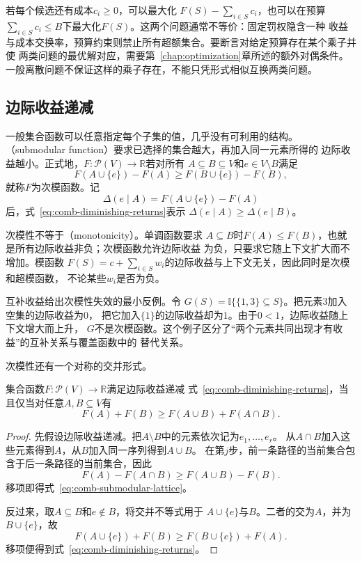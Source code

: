 若每个候选还有成本$c_i\geq0$，可以最大化
$F(S)-\sum_{i\in S}c_i$，也可以在预算
$\sum_{i\in S}c_i\leq B$下最大化$F(S)$。这两个问题通常不等价：固定罚权隐含一种
收益与成本交换率，预算约束则禁止所有超额集合。要断言对给定预算存在某个乘子并使
两类问题的最优解对应，需要第~\ref{chap:optimization}章所述的额外对偶条件。
一般离散问题不保证这样的乘子存在，不能只凭形式相似互换两类问题。

\subsection{边际收益递减}

一般集合函数可以任意指定每个子集的值，几乎没有可利用的结构。
（submodular function）要求已选择的集合越大，再加入同一元素所得的
边际收益越小。正式地，$F:\mathcal{P}(V)\to\mathbb{R}$若对所有
$A\subseteq B\subseteq V$和$e\in V\setminus B$满足
\begin{equation}
  F(A\cup\{e\})-F(A)
  \geq
  F(B\cup\{e\})-F(B),
  \label{eq:comb-diminishing-returns}
\end{equation}
就称$F$为次模函数。记
\[
  \Delta(e\mid A)=F(A\cup\{e\})-F(A)
\]
后，式~\eqref{eq:comb-diminishing-returns}表示
$\Delta(e\mid A)\geq\Delta(e\mid B)$。

次模性不等于（monotonicity）。单调函数要求
$A\subseteq B$时$F(A)\leq F(B)$，也就是所有边际收益非负；次模函数允许边际收益
为负，只要求它随上下文扩大而不增加。模函数
$F(S)=c+\sum_{i\in S}w_i$的边际收益与上下文无关，因此同时是次模和超模函数，
不论某些$w_i$是否为负。

互补收益给出次模性失效的最小反例。令
$G(S)=\mathbb{I}\{\{1,3\}\subseteq S\}$。把元素$3$加入空集的边际收益为$0$，
把它加入$\{1\}$的边际收益却为$1$。由于$0<1$，边际收益随上下文增大而上升，
$G$不是次模函数。这个例子区分了“两个元素共同出现才有收益”的互补关系与覆盖函数中的
替代关系。

次模性还有一个对称的交并形式。

\begin{theorem}[次模性的两个等价定义]
\label{thm:comb-submodular-equivalence}
集合函数$F:\mathcal{P}(V)\to\mathbb{R}$满足边际收益递减
式~\eqref{eq:comb-diminishing-returns}，当且仅当对任意$A,B\subseteq V$有
\begin{equation}
  F(A)+F(B)\geq F(A\cup B)+F(A\cap B).
  \label{eq:comb-submodular-lattice}
\end{equation}
\end{theorem}

\begin{proof}
先假设边际收益递减。把$A\setminus B$中的元素依次记为$e_1,\ldots,e_r$。
从$A\cap B$加入这些元素得到$A$，从$B$加入同一序列得到$A\cup B$。
在第$j$步，前一条路径的当前集合包含于后一条路径的当前集合，因此
\[
  F(A)-F(A\cap B)
  \geq F(A\cup B)-F(B).
\]
移项即得式~\eqref{eq:comb-submodular-lattice}。

反过来，取$A\subseteq B$和$e\notin B$，将交并不等式用于
$A\cup\{e\}$与$B$。二者的交为$A$，并为$B\cup\{e\}$，故
\[
  F(A\cup\{e\})+F(B)
  \geq F(B\cup\{e\})+F(A).
\]
移项便得到式~\eqref{eq:comb-diminishing-returns}。
\end{proof}

